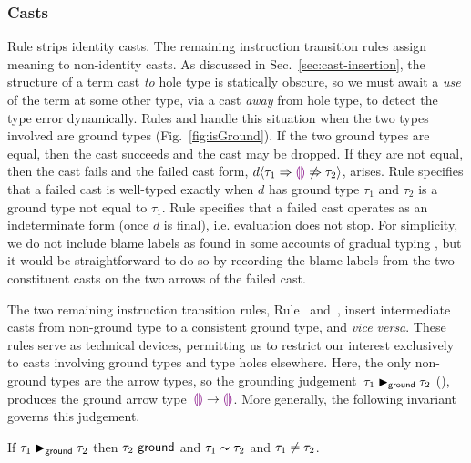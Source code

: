 

\subsubsection{Casts}
Rule  strips identity casts. The remaining instruction
transition rules assign meaning to non-identity casts.
%
As discussed in Sec.~\ref{sec:cast-insertion}, the structure of a term
cast \emph{to} hole type is statically obscure,
%
so we must await a \emph{use} of the term at some other type, via a
cast \emph{away} from hole type, to detect the type error dynamically.
%
Rules  and  handle this situation when the
two types involved are ground types (Fig.~\ref{fig:isGround}).
%
If the two ground types are equal, then the cast succeeds and the cast
may be dropped.
%
If they are not equal, then the cast fails and the failed cast form,
$d \langle{\tau_1}\Rightarrow{\textcolor{violet}{\llparenthesis}\textcolor{violet}{\rrparenthesis}}\not\Rightarrow{\tau_2}\rangle$, arises.
%
Rule  specifies that a failed cast is well-typed exactly
when $d$ has ground type $\tau_1$ and $\tau_2$ is a ground type
not equal to $\tau_1$.
%
Rule  specifies that a failed cast operates as an
indeterminate form (once $d$ is final), i.e. evaluation does not stop. For simplicity, we do not include blame labels as found in some accounts of gradual typing \cite{DBLP:conf/esop/WadlerF09,DBLP:conf/snapl/SiekVCB15}, but it would be straightforward to do so by recording the blame labels from the two constituent casts on the two arrows of the failed cast.

%
The two remaining instruction transition rules, Rule~
and~, insert intermediate casts from non-ground type to a
consistent ground type, and \emph{vice versa}.
%
These rules serve as technical devices, permitting us to restrict our
interest exclusively to casts involving ground types and type holes elsewhere.
%
Here, the only non-ground types are the arrow types, so the grounding
judgement~$\tau_1 \blacktriangleright_{\mathsf{ground}} \tau_2$ (),
produces the ground arrow type~$\textcolor{violet}{\llparenthesis}\textcolor{violet}{\rrparenthesis} \rightarrow \textcolor{violet}{\llparenthesis}\textcolor{violet}{\rrparenthesis}$.
%
More generally, the following invariant governs this judgement.
\begin{lem}[Grounding]
  If $\tau_1 \blacktriangleright_{\mathsf{ground}} \tau_2$
  then $\tau_2~\mathsf{ground}$
  and $\tau_1 \sim \tau_2$
  and $\tau_1\neq\tau_2$.
\end{lem}

